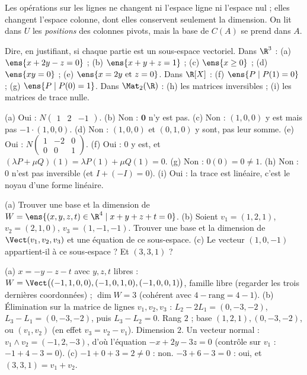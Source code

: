 \begin{qcm}
\begin{question}[plusieurs]
\begin{explication}
Les opérations sur les lignes ne changent ni l'espace ligne ni l'espace nul ; elles changent l'espace colonne, dont elles conservent seulement la dimension. On lit dans $U$ les \emph{positions} des colonnes pivots, mais la base de $C(A)$ se prend dans $A$.
\end{explication}
\end{question}
\end{qcm}

\begin{exo}
Dire, en justifiant, si chaque partie est un sous-espace vectoriel. Dans $\R^3$ : (a) $\ens{x+2y-z=0}$ ; (b) $\ens{x+y+z=1}$ ; (c) $\ens{x\ge0}$ ; (d) $\ens{xy=0}$ ; (e) $\ens{x=2y \text{ et } z=0}$. Dans $\R[X]$ : (f) $\ens{P\mid P(1)=0}$ ; (g) $\ens{P\mid P(0)=1}$. Dans $\Mat_2(\R)$ : (h) les matrices inversibles ; (i) les matrices de trace nulle.
\begin{corrige}
(a) Oui : $N\begin{pmatrix}1&2&-1\end{pmatrix}$. (b) Non : $\mathbf 0$ n'y est pas. (c) Non : $(1,0,0)$ y est mais pas $-1\cdot(1,0,0)$. (d) Non : $(1,0,0)$ et $(0,1,0)$ y sont, pas leur somme. (e) Oui : $N\begin{pmatrix}1&-2&0\\0&0&1\end{pmatrix}$. (f) Oui : $0$ y est, et $(\lambda P+\mu Q)(1)=\lambda P(1)+\mu Q(1)=0$. (g) Non : $0(0)=0\neq1$. (h) Non : $0$ n'est pas inversible (et $I+(-I)=0$). (i) Oui : la trace est linéaire, c'est le noyau d'une forme linéaire.
\end{corrige}
\end{exo}
\begin{exo}
(a) Trouver une base et la dimension de $W=\ens{(x,y,z,t)\in\R^4\mid x+y+z+t=0}$.
(b) Soient $v_1=(1,2,1)$, $v_2=(2,1,0)$, $v_3=(1,-1,-1)$. Trouver une base et la dimension de $\Vect(v_1,v_2,v_3)$ et une équation de ce sous-espace.
(c) Le vecteur $(1,0,-1)$ appartient-il à ce sous-espace ? Et $(3,3,1)$ ?
\begin{corrige}
(a) $x=-y-z-t$ avec $y,z,t$ libres : $W=\Vect\big((-1,1,0,0),(-1,0,1,0),(-1,0,0,1)\big)$, famille libre (regarder les trois dernières coordonnées) ; $\dim W=3$ (cohérent avec $4-\text{rang}=4-1$).
(b) Élimination sur la matrice de lignes $v_1,v_2,v_3$ : $L_2-2L_1=(0,-3,-2)$, $L_3-L_1=(0,-3,-2)$, puis $L_3-L_2=0$. Rang $2$ ; base $(1,2,1),(0,-3,-2)$, ou $(v_1,v_2)$ (en effet $v_3=v_2-v_1$). Dimension $2$. Un vecteur normal : $v_1\wedge v_2=(-1,2,-3)$, d'où l'équation $-x+2y-3z=0$ (contrôle sur $v_1$ : $-1+4-3=0$).
(c) $-1+0+3=2\neq0$ : non. $-3+6-3=0$ : oui, et $(3,3,1)=v_1+v_2$.
\end{corrige}
\end{exo}
